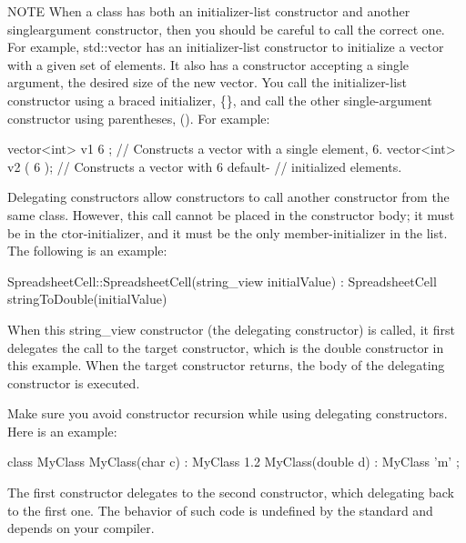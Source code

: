 \begin{myNotic}{NOTE}
When a class has both an initializer-list constructor and another singleargument constructor, then you should be careful to call the correct one. For example, std::vector has an initializer-list constructor to initialize a vector with a given set of elements. It also has a constructor accepting a single argument, the desired size of the new vector. You call the initializer-list constructor using a braced initializer, \{\}, and call the other single-argument constructor using parentheses, (). For example:

\begin{cpp}
vector<int> v1 { 6 }; // Constructs a vector with a single element, 6.
vector<int> v2 ( 6 ); // Constructs a vector with 6 default-
                      // initialized elements.
\end{cpp}
\end{myNotic}


Delegating constructors allow constructors to call another constructor from the same class. However, this call cannot be placed in the constructor body; it must be in the ctor-initializer, and it must be the only member-initializer in the list. The following is an example:

\begin{cpp}
SpreadsheetCell::SpreadsheetCell(string_view initialValue)
: SpreadsheetCell { stringToDouble(initialValue) }
{}
\end{cpp}

When this string\_view constructor (the delegating constructor) is called, it first delegates the call to the target constructor, which is the double constructor in this example. When the target constructor returns, the body of the delegating constructor is executed.

Make sure you avoid constructor recursion while using delegating constructors. Here is an example:

\begin{cpp}
class MyClass
{
    MyClass(char c) : MyClass { 1.2 } { }
    MyClass(double d) : MyClass { 'm' } { }
};
\end{cpp}

The first constructor delegates to the second constructor, which delegating back to the first one. The behavior of such code is undefined by the standard and depends on your compiler.



